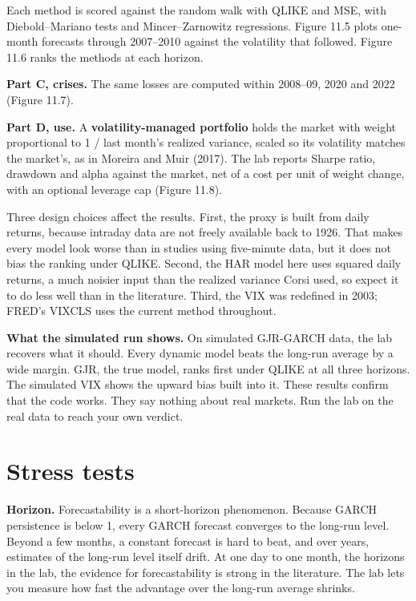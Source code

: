 Each method is scored against the random walk with QLIKE and MSE, with Diebold--Mariano tests and Mincer--Zarnowitz regressions. Figure 11.5 plots one-month forecasts through 2007--2010 against the volatility that followed. Figure 11.6 ranks the methods at each horizon.

\textbf{Part C, crises.} The same losses are computed within 2008--09, 2020 and 2022 (Figure 11.7).

\textbf{Part D, use.} A \textbf{volatility-managed portfolio} holds the market with weight proportional to 1 / last month's realized variance, scaled so its volatility matches the market's, as in Moreira and Muir (2017). The lab reports Sharpe ratio, drawdown and alpha against the market, net of a cost per unit of weight change, with an optional leverage cap (Figure 11.8).

Three design choices affect the results. First, the proxy is built from daily returns, because intraday data are not freely available back to 1926. That makes every model look worse than in studies using five-minute data, but it does not bias the ranking under QLIKE. Second, the HAR model here uses squared daily returns, a much noisier input than the realized variance Corsi used, so expect it to do less well than in the literature. Third, the VIX was redefined in 2003; FRED's VIXCLS uses the current method throughout.

\textbf{What the simulated run shows.} On simulated GJR-GARCH data, the lab recovers what it should. Every dynamic model beats the long-run average by a wide margin. GJR, the true model, ranks first under QLIKE at all three horizons. The simulated VIX shows the upward bias built into it. These results confirm that the code works. They say nothing about real markets. Run the lab on the real data to reach your own verdict.

\section{Stress tests}
\label{sec:11-stress}

\textbf{Horizon.} Forecastability is a short-horizon phenomenon. Because GARCH persistence is below 1, every GARCH forecast converges to the long-run level. Beyond a few months, a constant forecast is hard to beat, and over years, estimates of the long-run level itself drift. At one day to one month, the horizons in the lab, the evidence for forecastability is strong in the literature. The lab lets you measure how fast the advantage over the long-run average shrinks.

